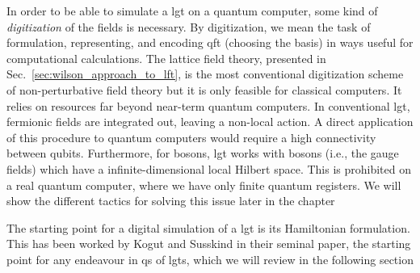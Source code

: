 In order to be able to simulate a \ac{lgt} on a quantum computer, some kind of \emph{digitization} of the fields is necessary.
By digitization, we mean the task of formulation, representing, and encoding \ac{qft} (choosing the basis) in ways useful for computational calculations.
The lattice field theory, presented in Sec.~\ref{sec:wilson_approach_to_lft}, is the most conventional digitization scheme of non-perturbative field theory but it is only feasible for classical computers.
It relies on resources far beyond near-term quantum computers.
In conventional \ac{lgt}, fermionic fields are integrated out, leaving a non-local action.
A direct application of this procedure to quantum computers would require a high connectivity between qubits.
Furthermore, for bosons, \ac{lgt} works with bosons (i.e., the gauge fields) which have a infinite-dimensional local Hilbert space.
This is prohibited on a real quantum computer, where we have only finite quantum registers.
We will show the different tactics for solving this issue later in the chapter

The starting point for a digital simulation of a \ac{lgt} is its Hamiltonian formulation.
This has been worked by Kogut and Susskind in their seminal paper\citneeded, the starting point for any endeavour in \ac{qs} of \ac{lgt}s, which we will review in the following section



